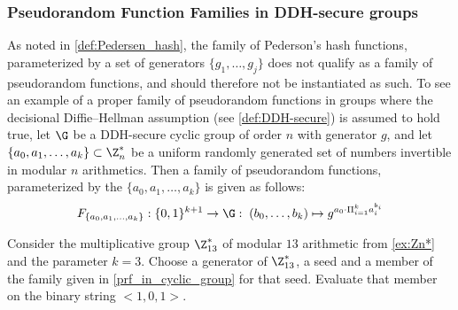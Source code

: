 \subsubsection{Pseudorandom Function Families in DDH-secure groups}
As noted in \ref{def:Pedersen_hash}, the family of Pederson's hash functions, parameterized by a set of generators $\{g_1,\ldots,g_j\}$ does not qualify as a family of pseudorandom functions, and should therefore not be instantiated as such. To see an example of a proper family of pseudorandom functions in groups where the decisional Diffie--Hellman assumption (see \secname \ref{def:DDH-secure}) is assumed to hold true, let $\G$ be a DDH-secure cyclic group of order $n$ with generator $g$, and let $\{a_0,a_1,\ldots,a_k\}\subset \Z_{n}^*$ be a uniform randomly generated set of numbers invertible in modular $n$ arithmetics. Then a family of pseudorandom functions, parameterized by the  $\{a_0,a_1,\ldots,a_k\}$ is given as follows:
\begin{equation}
\label{prf_in_cyclic_group}
F_{\{a_0,a_1,\ldots,a_k\}}: \{0,1\}^{k+1} \to \G:\; (b_0,\ldots,b_k)\mapsto g^{a_0\cdot \Pi_{i=1}^k a_i^{b_i}}
\end{equation}
\begin{exercise} Consider the multiplicative group $\Z_{13}^*$ of modular $13$ arithmetic from \examplename{} \ref{ex:Zn*} and the parameter $k=3$. Choose a generator of $\Z_{13}^*$, a seed and  a member of the family given in \eqref{prf_in_cyclic_group} for that seed. Evaluate that member on the binary string $<1,0,1>$.
\end{exercise}



